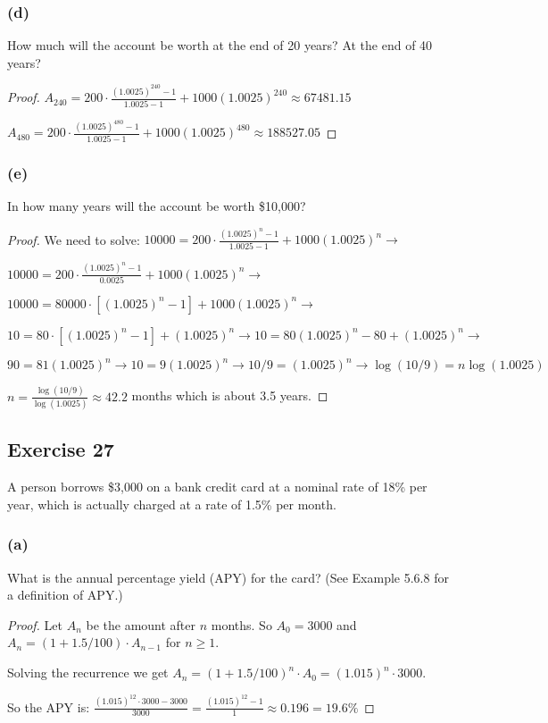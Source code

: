 \documentclass[14pt]{extarticle}
\newcommand{\dps}{\displaystyle}
\begin{document}
\subsubsection{(d)}
How much will the account be worth at the end of 20 years? At the end of 40 years?

\begin{proof}
    \(A_{240} = \dps 200 \cdot \frac{(1.0025)^{240} - 1}{1.0025 - 1} + 1000(1.0025)^{240} \approx 67481.15\)

    \(A_{480} = \dps 200 \cdot \frac{(1.0025)^{480} - 1}{1.0025 - 1} + 1000(1.0025)^{480} \approx 188527.05\)
\end{proof}

\subsubsection{(e)}
In how many years will the account be worth \$10,000?

\begin{proof}
    We need to solve:
    \(10000 = \dps 200 \cdot \frac{(1.0025)^n - 1}{1.0025 - 1} + 1000(1.0025)^n \to\)

    \(10000 = \dps 200 \cdot \frac{(1.0025)^n - 1}{0.0025} + 1000(1.0025)^n \to\)

    \(10000 = \dps 80000 \cdot [(1.0025)^n - 1] + 1000(1.0025)^n \to\)

    \(10 = 80 \cdot [(1.0025)^n - 1] + (1.0025)^n \to 10 = 80 (1.0025)^n - 80 + (1.0025)^n \to\)

    \(90 = 81 (1.0025)^n \to 10 = 9 (1.0025)^n \to 10/9 = (1.0025)^n \to \log(10/9) = n \log(1.0025)\)

    \(\dps n = \frac{\log(10/9)}{\log(1.0025)} \approx 42.2\) months which is about 3.5 years.
\end{proof}

\subsection{Exercise 27}
A person borrows \$3,000 on a bank credit card at a nominal
rate of 18\% per year, which is actually charged at a rate of 1.5\% per month.

\subsubsection{(a)}
What is the annual percentage yield (APY) for the card? (See Example 5.6.8 for a definition of APY.)

\begin{proof}
    Let $A_n$ be the amount after $n$ months. So \(A_0 = 3000\) and \(A_n = (1 + 1.5/100) \cdot A_{n-1}\) for \(n \geq 1\).

    Solving the recurrence we get \(A_n = (1 + 1.5/100)^n \cdot A_0 = (1.015)^n \cdot 3000.\)

    So the APY is: \(\dps \frac{(1.015)^{12} \cdot 3000 - 3000}{3000} =
    \frac{(1.015)^{12} - 1}{1} \approx 0.196 =  19.6\%\)
\end{proof}
\end{document}

